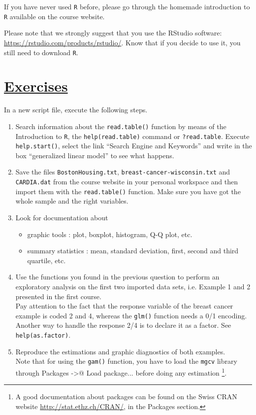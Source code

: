 \documentclass[a4paper,12pt]{article}\usepackage[]{graphicx}\usepackage[]{color}
\begin{document}
If you have never used \texttt{R} before, please go through the homemade introduction to \texttt{R} available on the course website.

Please note that we strongly suggest that you use the RStudio software: \url{https://rstudio.com/products/rstudio/}. Know that if you decide to use it, you still need to download \texttt{R}.

\section{\underline{Exercises}}

In a new script file, execute the following steps.

\begin{enumerate}
\item{Search information about the \verb'read.table()' function by means of the Introduction to \texttt{R}, the \verb'help(read.table)' command or \verb'?read.table'. Execute \verb'help.start()', select the link ``Search Engine and Keywords'' and write in the box ``generalized linear model'' to see what happens.}
\item{Save the files \verb'BostonHousing.txt', \verb'breast-cancer-wisconsin.txt' and \verb'CARDIA.dat' from the course website in your personal workspace and then import them with the \verb'read.table()' function. Make sure you have got the whole sample and the right variables.}
\item{Look for documentation about
     \begin{itemize}
     \item{graphic tools : plot, boxplot, histogram, Q-Q plot, etc.}
     \item{summary statistics : mean, standard deviation, first, second and third quartile, etc.}
     \end{itemize}}
\item{Use the functions you found in the previous question to perform an exploratory analysis on the first two imported data sets, i.e. Example 1 and 2 presented in the first course.\\ Pay attention to the fact that the response variable of the breast cancer example is coded 2 and 4, whereas the \verb'glm()' function needs a 0/1 encoding. Another way to handle the response 2/4 is to declare it as a factor. See \texttt{help(as.factor)}.}
\item{Reproduce the estimations and graphic diagnostics of both examples.\\Note that for using the \verb'gam()' function, you have to load the \verb'mgcv' library through \textsf{Packages} \verb@->@ \textsf{Load package...} before doing any estimation \footnote{A good documentation about packages can be found on the Swiss CRAN website \url{http://stat.ethz.ch/CRAN/}, in the Packages section.}.}
\end{enumerate}
\end{document}
